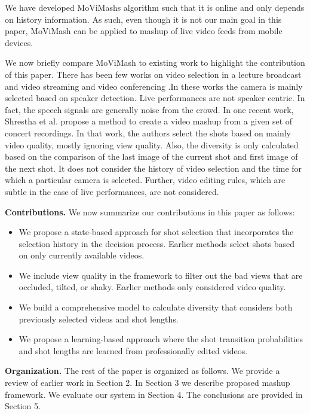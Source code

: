 \documentclass{new}
\begin{document}
We have developed MoViMash\textquotesingle s algorithm such that it is online
and only depends on history information. As such, even though
it is not our main goal in this paper, MoViMash can be applied to
mashup of live video feeds from mobile devices.

We now briefly compare MoViMash to existing work to highlight
the contribution of this paper. There has been few works on
video selection in a lecture broadcast and video streaming\cite{rfc21} \cite{rfc6}
and video conferencing \cite{rfc3}.In these works the camera is mainly
selected based on speaker detection. Live performances are not
speaker centric. In fact, the speech signals are generally noise from
the crowd. In one recent work, Shrestha et al. \cite{rfc15} propose a
method to create a video mashup from a given set of concert recordings.
In that work, the authors select the shots based on mainly
video quality, mostly ignoring view quality. Also, the diversity is
only calculated based on the comparison of the last image of the
current shot and first image of the next shot. It does not consider
the history of video selection and the time for which a particular
camera is selected. Further, video editing rules, which are subtle in
the case of live performances, are not considered.

\textbf{Contributions.} We now summarize our contributions in this paper
as follows:
\begin{itemize}
  \item We propose a state-based approach for shot selection that incorporates
the selection history in the decision process. Earlier methods select shots based on only currently available videos.
  \item We include view quality in the framework to filter out the
bad views that are occluded, tilted, or shaky. Earlier methods
only considered video quality.
  \item We build a comprehensive model to calculate diversity that
considers both previously selected videos and shot lengths.
  \item We propose a learning-based approach where the shot transition
probabilities and shot lengths are learned from professionally
edited videos.
\end{itemize}

\textbf{Organization.} The rest of the paper is organized as follows.
We provide a review of earlier work in Section 2. In Section 3 we
describe proposed mashup framework. We evaluate our system in
Section 4. The conclusions are provided in Section 5.
\end{document}
